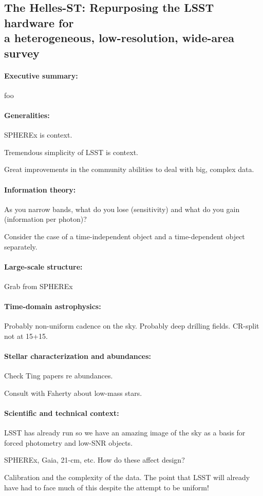 \documentclass[12pt]{article}
\begin{document}
\subsection*{The Helles-ST: Repurposing the LSST hardware for\\ a heterogeneous, low-resolution, wide-area survey}

\paragraph{Executive summary:}
foo

\paragraph{Generalities:}
SPHEREx is context.

Tremendous simplicity of LSST is context.

Great improvements in the community abilities to deal with big, complex data.

\paragraph{Information theory:}
As you narrow bands, what do you lose (sensitivity) and what do you gain (information per photon)?

Consider the case of a time-independent object and a time-dependent object separately.

\paragraph{Large-scale structure:}
Grab from SPHEREx

\paragraph{Time-domain astrophysics:}
Probably non-uniform cadence on the sky.
Probably deep drilling fields.
CR-split not at 15+15.

\paragraph{Stellar characterization and abundances:}
Check Ting papers re abundances.

Consult with Faherty about low-mass stars.

\paragraph{Scientific and technical context:}
LSST has already run so we have an amazing image of the sky as a basis for forced photometry and low-SNR objects.

SPHEREx, Gaia, 21-cm, etc. How do these affect design?

Calibration and the complexity of the data.
The point that LSST will already have had to face much of this despite the attempt to be uniform!
\end{document}
